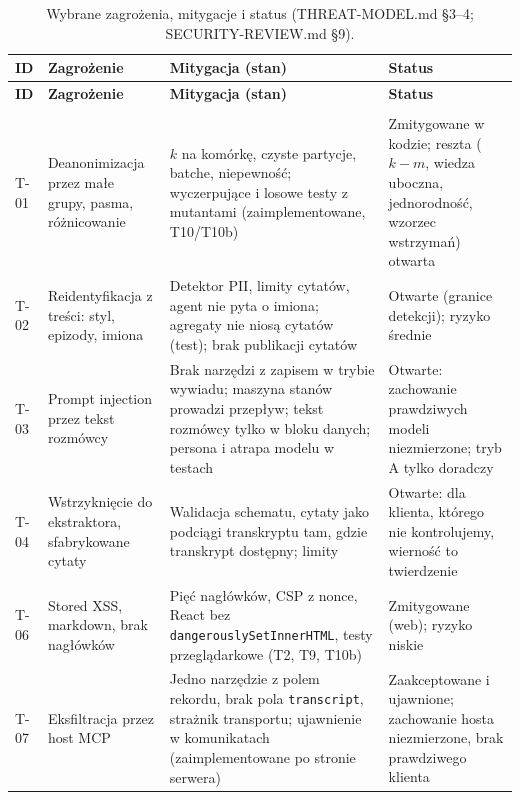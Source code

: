\begin{longtable}{@{}>{\raggedright\arraybackslash}p{1.1cm}>{\raggedright\arraybackslash}p{3.2cm}>{\raggedright\arraybackslash}p{6.4cm}>{\raggedright\arraybackslash}p{3.0cm}@{}}
\caption{Wybrane zagrożenia, mitygacje i status (THREAT-MODEL.md §3--4; SECURITY-REVIEW.md §9).}\label{tab:p3-zagrozenia}\\
\toprule
\textbf{ID} & \textbf{Zagrożenie} & \textbf{Mitygacja (stan)} & \textbf{Status} \\
\midrule
\endfirsthead
\toprule
\textbf{ID} & \textbf{Zagrożenie} & \textbf{Mitygacja (stan)} & \textbf{Status} \\
\midrule
\endhead
\midrule \multicolumn{4}{r}{\emph{ciąg dalszy na następnej stronie}} \\
\endfoot
\bottomrule
\endlastfoot
T-01 & Deanonimizacja przez małe grupy, pasma, różnicowanie &
$k$ na komórkę, czyste partycje, batche, niepewność; wyczerpujące i losowe testy z mutantami (zaimplementowane, T10/T10b) &
Zmitygowane w kodzie; reszta ($k-m$, wiedza uboczna, jednorodność, wzorzec wstrzymań) otwarta \\
\addlinespace
T-02 & Reidentyfikacja z treści: styl, epizody, imiona &
Detektor PII, limity cytatów, agent nie pyta o imiona; agregaty nie niosą cytatów (test); brak publikacji cytatów &
Otwarte (granice detekcji); ryzyko średnie \\
\addlinespace
T-03 & Prompt injection przez tekst rozmówcy &
Brak narzędzi z zapisem w trybie wywiadu; maszyna stanów prowadzi przepływ; tekst rozmówcy tylko w bloku danych; persona i atrapa modelu w testach &
Otwarte: zachowanie prawdziwych modeli niezmierzone; tryb A tylko doradczy \\
\addlinespace
T-04 & Wstrzyknięcie do ekstraktora, sfabrykowane cytaty &
Walidacja schematu, cytaty jako podciągi transkryptu tam, gdzie transkrypt dostępny; limity &
Otwarte: dla klienta, którego nie kontrolujemy, wierność to twierdzenie \\
\addlinespace
T-06 & Stored XSS, markdown, brak nagłówków &
Pięć nagłówków, CSP z nonce, React bez \texttt{dangerouslySetInnerHTML}, testy przeglądarkowe (T2, T9, T10b) &
Zmitygowane (web); ryzyko niskie \\
\addlinespace
T-07 & Eksfiltracja przez host MCP &
Jedno narzędzie z polem rekordu, brak pola \texttt{transcript}, strażnik transportu; ujawnienie w komunikatach (zaimplementowane po stronie serwera) &
Zaakceptowane i ujawnione; zachowanie hosta niezmierzone, brak prawdziwego klienta \\

\end{longtable}
